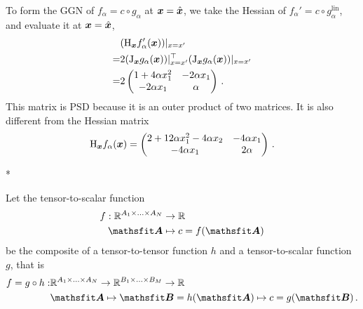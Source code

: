 \begin{example}
  To form the GGN of $f_{\alpha} = c \circ g_{\alpha}$ at ${\bm{x}} = \hat{{\bm{x}}}$, we take the Hessian of $f_{\alpha}' = c \circ g_{\alpha}^{\text{lin}}$, and evaluate it at ${\bm{x}} = \hat{{\bm{x}}}$,
  \begin{align*}
    & (\mathrm{H}_{{\bm{x}}} f_{\alpha}'({\bm{x}}))|_{x=x'}
    \\
    = & 2 (\mathrm{J}_{{\bm{x}}} g_{\alpha}({\bm{x}}))|_{x=x'}^{\top}
        (\mathrm{J}_{{\bm{x}}} g_{\alpha}({\bm{x}}))|_{x=x'}
    \\
    = & 2
        \begin{pmatrix}
          1 + 4\alpha x_1^2 & -2 \alpha x_1 \\
          -2 \alpha x_1     & \alpha
        \end{pmatrix}\,.
  \end{align*}
  This matrix is PSD because it is an outer product of two matrices.
  It is also different from the Hessian matrix
  \begin{align*}
    \mathrm{H}_{{\bm{x}}} f_{\alpha}({\bm{x}})
    =
    \begin{pmatrix}
      2 + 12 \alpha x_1^2 - 4 \alpha x_2 & -4 \alpha x_1 \\
      -4 \alpha x_1                      & 2 \alpha
    \end{pmatrix}\,.
  \end{align*}
\end{example}


\switchcolumn[1]*
\switchcolumn[0]

\begin{setup}\label{setup:composite_tensor_to_tensor_to_scalar_function}
  Let the tensor-to-scalar function
  \begin{align*}
    f: \sR^{A_1 \times \ldots \times A_N} & \to \sR
    \\
    \tA                                   & \mapsto c = f(\tA)
  \end{align*}
  be the composite of a tensor-to-tensor function $h$ and a tensor-to-scalar function $g$, that is
  \begin{align*}
    f = g \circ h: & \sR^{A_1 \times \ldots \times A_N} \to \sR^{B_1 \times \ldots \times B_M}  \to \sR
    \\
                   & \tA \mapsto \tB = h(\tA) \mapsto c = g(\tB)\,.
  \end{align*}
\end{setup}

